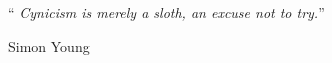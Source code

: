 
\vspace*{0.2\textheight}

%

\noindent\enquote{\foreignlanguage{russian}{\itshape 
Cynicism is merely a sloth, an excuse not to try.}}\bigbreak

\hfill Simon Young 
